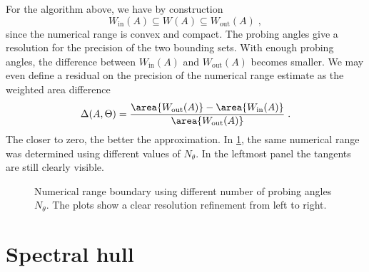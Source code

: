 For the algorithm above, we have by construction
\begin{equation}
W_{\text{in}}(A) \subseteq W(A) \subseteq W_{\text{out}}(A) \;,
\end{equation}
since the numerical range is convex and compact.
The probing angles give a resolution for the precision of the two bounding sets.
With enough probing angles, the difference between $W_{\text{in}}(A)$ and $W_{\text{out}}(A)$ becomes smaller.
We may even define a residual on the precision of the numerical range estimate as the weighted area difference
\begin{equation}
\Delta(A, \Theta) = \frac{ \area{W_{\text{out}}(A)} - \area{W_{\text{in}}(A)} }{ \area{W_{\text{out}}(A)} } \;.
\end{equation}
The closer to zero, the better the approximation.
In \cref{fig:nr:error}, the same numerical range was determined using different values of $N_{\theta}$.
In the leftmost panel the tangents are still clearly visible.

\begin{figure}
\centering

{}
\hfill
{}
\hfill
{}

\caption{
Numerical range boundary using different number of probing angles $N_{\theta}$.
The plots show a clear resolution refinement from left to right.
}
\label{fig:nr:error}
\end{figure}

\section{Spectral hull}
\label{app:C:spectral:hull}

